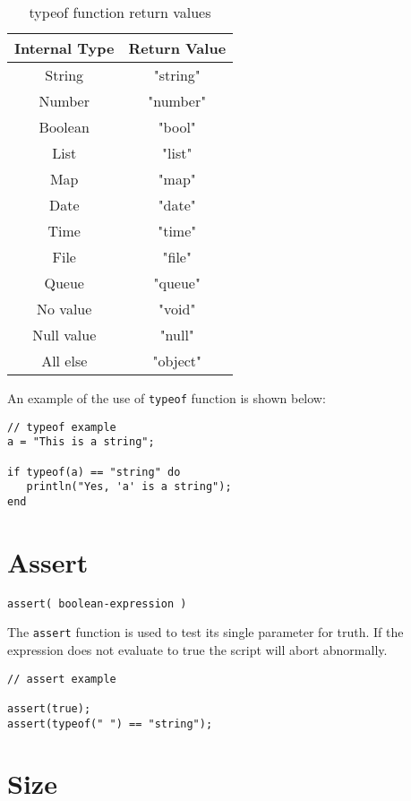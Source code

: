 \begin{table}[h!]
\centering
\begin{tabular} { | c | c | }
\hline
Internal Type     &  Return Value \\
\hline
String & "string" \\
Number &"number" \\
Boolean & "bool" \\
List & "list" \\
Map & "map" \\
Date & "date" \\
Time & "time" \\
File & "file" \\
Queue & "queue" \\
No value & "void" \\
Null value & "null" \\
All else & "object" \\
\hline
\end{tabular}
\label{tab:TypeOf}
\caption{typeof function return values}
\end{table}

An example of the use of \Verb+typeof+ function is shown below:

\begin{lstlisting}[caption={Typeof example}]
// typeof example
a = "This is a string";

if typeof(a) == "string" do
   println("Yes, 'a' is a string");
end

\end{lstlisting}

\section{Assert}
\begin{Verbatim}
assert( boolean-expression )
\end{Verbatim}

The \Verb+assert+ function is used to test its single parameter for truth. If the expression does not evaluate to true the \Reflex script will abort abnormally.

\begin{lstlisting}[caption={Assert example}]
// assert example

assert(true);
assert(typeof(" ") == "string");

\end{lstlisting}

\section{Size}

